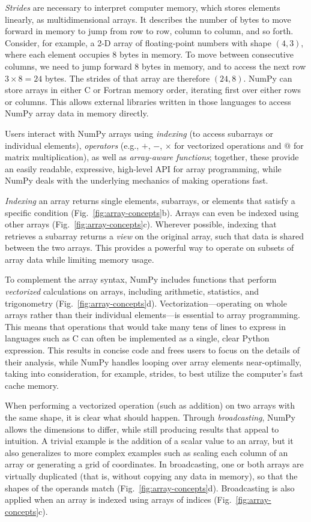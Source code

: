 \emph{Strides} are necessary to interpret computer memory, which stores elements
linearly, as multidimensional arrays.
It describes the number of bytes to move forward in memory to jump from row to
row, column to column, and so forth.
Consider, for example, a 2-D array of floating-point numbers with shape
$(4, 3)$, where each element occupies 8 bytes in memory.
To move between consecutive columns, we need to jump forward 8 bytes in memory,
and to access the next row $3 \times 8 = 24$ bytes.
The strides of that array are therefore $(24, 8)$.  NumPy can
store arrays in either C or Fortran memory order, iterating
first over either rows or columns.  This allows external libraries
written in those languages to access NumPy array data in memory directly.

Users interact with NumPy arrays using {\em indexing} (to access
subarrays or individual elements), {\em operators} (e.g., $+$, $-$, $\times$
for vectorized operations and $@$ for matrix multiplication), as well as {\em array-aware functions};
together, these provide an easily readable, expressive, high-level API for
array programming, while NumPy
deals with the underlying mechanics of making operations fast.

\emph{Indexing} an array returns single elements, subarrays, or elements that satisfy
a specific condition (Fig.~\ref{fig:array-concepts}b).
Arrays can even be indexed using other arrays (Fig.~\ref{fig:array-concepts}c).
Wherever possible, indexing that retrieves a subarray returns a {\em view} on
the original array, such that data is shared between the two arrays.
This provides a powerful way to operate on subsets of array data while
limiting memory usage.

To complement the array syntax, NumPy includes functions that perform
\emph{vectorized} calculations on arrays, including arithmetic, statistics, and
trigonometry (Fig.~\ref{fig:array-concepts}d).
Vectorization---operating on whole arrays rather than their individual
elements---is essential to array programming.
This means that operations that would take many tens of lines to express in
languages such as C can often be implemented as a single, clear Python
expression.
This results in concise code and frees users to focus on the details of
their analysis, while NumPy handles looping over array elements near-optimally,
taking into consideration, for example, strides, to best utilize the
computer's fast cache memory.

When performing a vectorized operation (such as addition) on two arrays with
the same shape, it is clear what should happen.
Through \emph{broadcasting}, NumPy allows the dimensions to differ, while
still producing results that appeal to intuition.
A trivial example is the addition of a scalar value to an array, but it also
generalizes to more complex examples such as scaling each column of an array
or generating a grid of coordinates.
In broadcasting, one or both arrays are virtually duplicated (that is, without
copying any data in memory), so that the shapes of the operands match
(Fig.~\ref{fig:array-concepts}d).
Broadcasting is also applied when an array is indexed using arrays of
indices (Fig.~\ref{fig:array-concepts}c).

